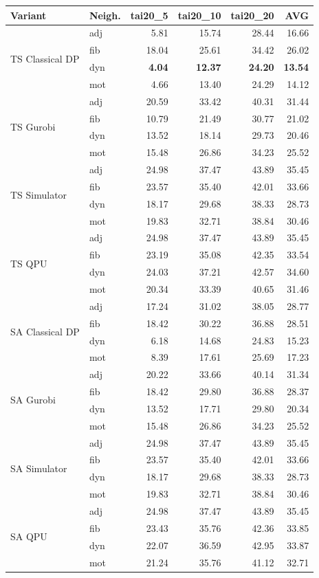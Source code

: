 \setlength{\tabcolsep}{3pt}
\begin{tabular}{@{}ll rrrr@{}}
\textbf{Variant} & \textbf{Neigh.} & tai20\_5 & tai20\_10 & tai20\_20 & \textbf{AVG} \\
\hline
\multirow{4}{*}{TS Classical DP} & adj & 5.81 & 15.74 & 28.44 & 16.66 \\
 & fib & 18.04 & 25.61 & 34.42 & 26.02 \\
 & dyn & {\bfseries 4.04} & {\bfseries 12.37} & {\bfseries 24.20} & {\bfseries 13.54} \\
 & mot & 4.66 & 13.40 & 24.29 & 14.12 \\
\hline
\multirow{4}{*}{TS Gurobi} & adj & 20.59 & 33.42 & 40.31 & 31.44 \\
 & fib & 10.79 & 21.49 & 30.77 & 21.02 \\
 & dyn & 13.52 & 18.14 & 29.73 & 20.46 \\
 & mot & 15.48 & 26.86 & 34.23 & 25.52 \\
\hline
\multirow{4}{*}{TS Simulator} & adj & 24.98 & 37.47 & 43.89 & 35.45 \\
 & fib & 23.57 & 35.40 & 42.01 & 33.66 \\
 & dyn & 18.17 & 29.68 & 38.33 & 28.73 \\
 & mot & 19.83 & 32.71 & 38.84 & 30.46 \\
\hline
\multirow{4}{*}{TS QPU} & adj & 24.98 & 37.47 & 43.89 & 35.45 \\
 & fib & 23.19 & 35.08 & 42.35 & 33.54 \\
 & dyn & 24.03 & 37.21 & 42.57 & 34.60 \\
 & mot & 20.34 & 33.39 & 40.65 & 31.46 \\
\hline
\multirow{4}{*}{SA Classical DP} & adj & 17.24 & 31.02 & 38.05 & 28.77 \\
 & fib & 18.42 & 30.22 & 36.88 & 28.51 \\
 & dyn & 6.18 & 14.68 & 24.83 & 15.23 \\
 & mot & 8.39 & 17.61 & 25.69 & 17.23 \\
\hline
\multirow{4}{*}{SA Gurobi} & adj & 20.22 & 33.66 & 40.14 & 31.34 \\
 & fib & 18.42 & 29.80 & 36.88 & 28.37 \\
 & dyn & 13.52 & 17.71 & 29.80 & 20.34 \\
 & mot & 15.48 & 26.86 & 34.23 & 25.52 \\
\hline
\multirow{4}{*}{SA Simulator} & adj & 24.98 & 37.47 & 43.89 & 35.45 \\
 & fib & 23.57 & 35.40 & 42.01 & 33.66 \\
 & dyn & 18.17 & 29.68 & 38.33 & 28.73 \\
 & mot & 19.83 & 32.71 & 38.84 & 30.46 \\
\hline
\multirow{4}{*}{SA QPU} & adj & 24.98 & 37.47 & 43.89 & 35.45 \\
 & fib & 23.43 & 35.76 & 42.36 & 33.85 \\
 & dyn & 22.07 & 36.59 & 42.95 & 33.87 \\
 & mot & 21.24 & 35.76 & 41.12 & 32.71 \\
\hline
\end{tabular}
